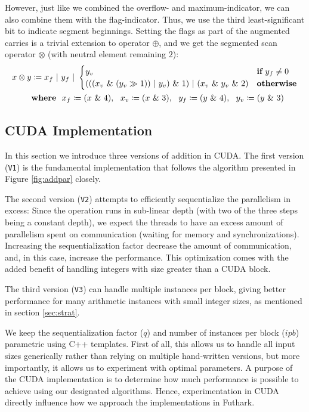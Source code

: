 However, just like we combined the overflow- and maximum-indicator, we can also
combine them with the flag-indicator. Thus, we use the third least-significant
bit to indicate segment beginnings. Setting the flags as part of the augmented
carries is a trivial extension to operator $\oplus$, and we get the segmented scan
operator $\otimes$ (with neutral element remaining $2$):
\begin{align}
  \label{eq:segscanop}
  x \otimes y &\coloneq x_f~|~y_f~|~\begin{cases} y_v & \textbf{if}~y_f \neq 0 \\ (((x_v~\&~(y_v \gg 1))~|~y_v)~\&~1)~|~(x_v~\&~y_v~\&~2) & \textbf{otherwise}\end{cases}\\
  & \textbf{where}~~x_f\coloneq (x~\&~4),~~x_v\coloneq (x~\&~3),~~y_f\coloneq (y~\&~4),~~y_v\coloneq (y~\&~3)\notag
\end{align}

\subsection{CUDA Implementation}
\label{subsec:addcud}

In this section we introduce three versions of addition in CUDA. The first
version (\texttt{V1}) is the fundamental implementation that follows the
algorithm presented in Figure \ref{fig:addpar} closely.

The second version (\texttt{V2}) attempts to efficiently sequentialize the
parallelism in excess: Since the operation runs in sub-linear depth (with two of
the three steps being a constant depth), we expect the threads to have an excess
amount of parallelism spent on communication (waiting for memory and
synchronizations). Increasing the sequentialization factor decrease the amount
of communication, and, in this case, increase the performance. This optimization
comes with the added benefit of handling integers with size greater than a CUDA
block.

The third version (\texttt{V3}) can handle multiple instances per block, giving
better performance for many arithmetic instances with small integer sizes, as
mentioned in section \ref{sec:strat}.

We keep the sequentialization factor ($q$) and number of instances per block
($\mathit{ipb}$) parametric using C++ templates. First of all, this allows us to
handle all input sizes generically rather than relying on multiple hand-written
versions, but more importantly, it allows us to experiment with optimal
parameters. A purpose of the CUDA implementation is to determine how much
performance is possible to achieve using our designated algorithms. Hence,
experimentation in CUDA directly influence how we approach the implementations in
Futhark.

